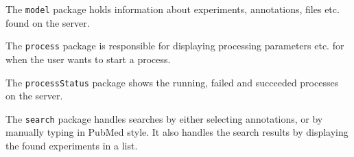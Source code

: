 	The \verb!model! package holds information about experiments, annotations, files etc. found on the server.
	
	The \verb!process! package is responsible for displaying processing parameters etc. for when the user wants to start a process.

	The \verb!processStatus! package shows the running, failed and succeeded processes on the server.
	
	The \verb!search! package handles searches by either selecting annotations, or by manually typing in PubMed style. It also handles the search results by displaying the found experiments in a list.
	
\pagebreak

